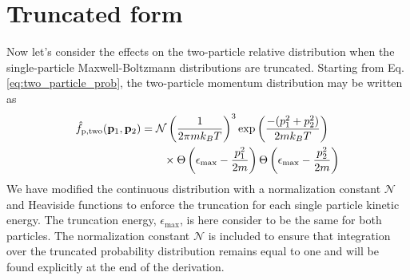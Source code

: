 \section{Truncated form}\label{sec:truncDist}
Now let's consider the effects on the two-particle relative distribution when the single-particle Maxwell-Boltzmann distributions are truncated.
Starting from Eq.\,\ref{eq:two_particle_prob}, the two-particle momentum distribution may be written as
\begin{equation}
\begin{split}
	\hat{f}_\text{p,two} (\mathbf{p}_1, \mathbf{p}_2) &= \mathcal{N} \left(\frac{1}{2 \pi m k_B T}\right)^3 \text{exp}\left( { \frac{-(p_1^2 + p_2^2)}{2 m k_B T}} \right) \\ &\quad\quad \times \Theta \left( {\epsilon_\text{max} - \frac{p_1^2}{2m}} \right) \Theta \left( {\epsilon_\text{max} - \frac{p_2^2}{2m}} \right)
\end{split}
\end{equation}
We have modified the continuous distribution with a normalization constant $\mathcal{N}$ and Heaviside functions to enforce the truncation for each single particle kinetic energy.
The truncation energy, $\epsilon_\text{max}$, is here consider to be the same for both particles.
The normalization constant $\mathcal{N}$ is included to ensure that integration over the truncated probability distribution remains equal to one and will be found explicitly at the end of the derivation.

